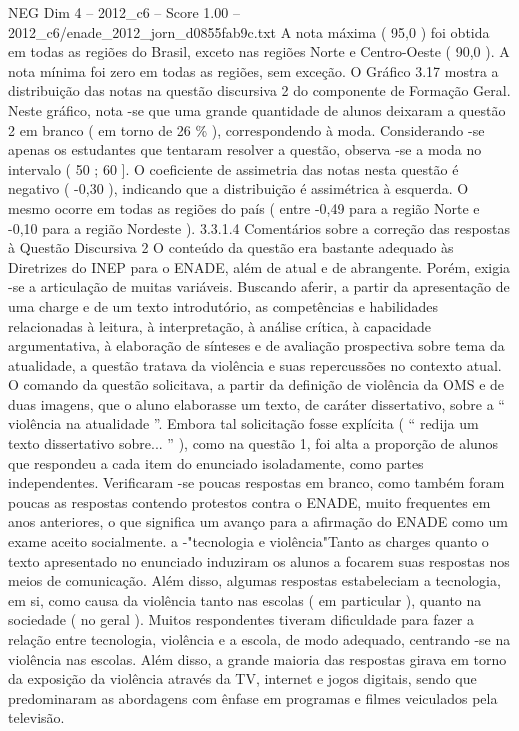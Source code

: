 \begin{textsample}{NEG Dim 4 – 2012\_c6 – Score 1.00 – 2012\_c6/enade\_2012\_jorn\_d0855fab9c.txt}
A nota máxima ( 95,0 ) foi obtida em todas as regiões do Brasil, exceto nas regiões Norte e Centro-Oeste ( 90,0 ).
A nota mínima foi zero em todas as regiões, sem exceção.
O Gráfico 3.17 mostra a distribuição das notas na questão discursiva 2 do componente de Formação Geral.
Neste gráfico, nota -se que uma grande quantidade de alunos deixaram a questão 2 em branco ( em torno de 26 \% ), correspondendo à moda.
Considerando -se apenas os estudantes que tentaram resolver a questão, observa -se a moda no intervalo ( 50 ; 60 ].
O coeficiente de assimetria das notas nesta questão é negativo ( -0,30 ), indicando que a distribuição é assimétrica à esquerda.
O mesmo ocorre em todas as regiões do país ( entre -0,49 para a região Norte e -0,10 para a região Nordeste ). 3.3.1.4 Comentários sobre a correção das respostas à Questão Discursiva 2 O conteúdo da questão era bastante adequado às Diretrizes do INEP para o ENADE, além de atual e de abrangente.
Porém, exigia -se a articulação de muitas variáveis.
Buscando aferir, a partir da apresentação de uma charge e de um texto introdutório, as competências e habilidades relacionadas à leitura, à interpretação, à análise crítica, à capacidade argumentativa, à elaboração de sínteses e de avaliação prospectiva sobre tema da atualidade, a questão tratava da violência e suas repercussões no contexto atual.
O comando da questão solicitava, a partir da definição de violência da OMS e de duas imagens, que o aluno elaborasse um texto, de caráter dissertativo, sobre a “ violência na atualidade ”.
Embora tal solicitação fosse explícita ( “ redija um texto dissertativo sobre... ” ), como na questão 1, foi alta a proporção de alunos que respondeu a cada item do enunciado isoladamente, como partes independentes.
Verificaram -se poucas respostas em branco, como também foram poucas as respostas contendo protestos contra o ENADE, muito frequentes em anos anteriores, o que significa um avanço para a afirmação do ENADE como um exame aceito socialmente. a -"tecnologia e violência"Tanto as charges quanto o texto apresentado no enunciado induziram os alunos a focarem suas respostas nos meios de comunicação.
Além disso, algumas respostas estabeleciam a tecnologia, em si, como causa da violência tanto nas escolas ( em particular ), quanto na sociedade ( no geral ).
Muitos respondentes tiveram dificuldade para fazer a relação entre tecnologia, violência e a escola, de modo adequado, centrando -se na violência nas escolas.
Além disso, a grande maioria das respostas girava em torno da exposição da violência através da TV, internet e jogos digitais, sendo que predominaram as abordagens com ênfase em programas e filmes veiculados pela televisão.

\end{textsample}
